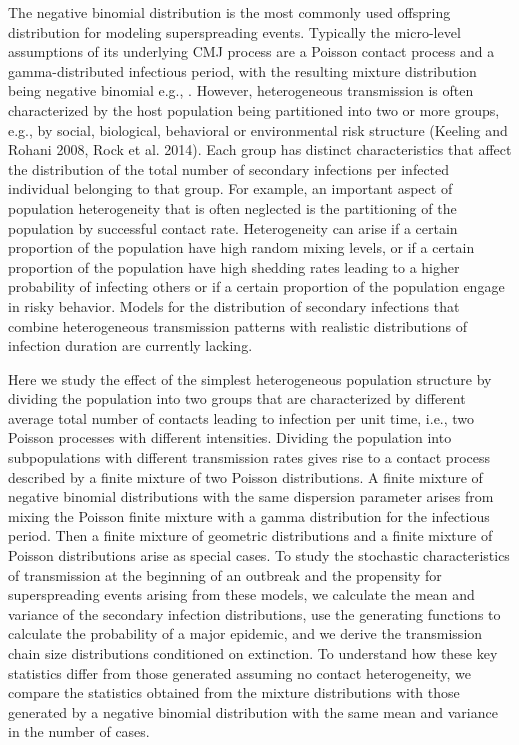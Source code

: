 \documentclass{imammb}
\numberwithin{equation}{section}
\begin{document}
The negative binomial distribution is the most commonly used offspring distribution for modeling superspreading events. Typically the micro-level assumptions of its underlying CMJ process are a Poisson contact process and a gamma-distributed infectious period, with the resulting mixture distribution being negative binomial e.g., \citep{Lloyd-Smith2005-ma}. However, heterogeneous transmission is often characterized by the host population being partitioned into two or more groups, e.g., by social, biological, behavioral or environmental risk structure (Keeling and Rohani 2008, Rock et al. 2014).   Each group has distinct characteristics that affect the distribution of the total number of secondary infections per infected individual belonging to that group. For example, an important aspect of population heterogeneity that is often neglected is the partitioning of the population by successful contact rate. Heterogeneity can arise if a certain proportion of the population have high random mixing levels, or if a certain proportion of the population have high shedding rates leading to a higher probability of infecting others or if a certain proportion of the population engage in risky behavior. Models for the distribution of secondary infections that combine heterogeneous transmission patterns with realistic distributions of infection duration are currently lacking.
 
Here we study the effect of the simplest heterogeneous population structure by dividing the population into two groups that are characterized by different average total number of contacts leading to infection per unit time, i.e., two Poisson processes with different intensities. Dividing the population into subpopulations with different transmission rates gives rise to a contact process described by a finite mixture of two Poisson distributions. A finite mixture of negative binomial distributions with the same dispersion parameter arises from mixing the Poisson finite mixture with a gamma distribution for the infectious period. Then a finite mixture of geometric distributions and a finite mixture of Poisson distributions arise as special cases.  To study the stochastic characteristics of transmission at the beginning of an outbreak and the propensity for superspreading events arising from these models, we calculate the mean and variance of the secondary infection distributions, use the generating functions to calculate the probability of a major epidemic, and we derive the transmission chain size distributions conditioned on extinction. To understand how these key statistics differ from those generated assuming no contact heterogeneity, we compare the statistics obtained from the mixture distributions with those generated by a negative binomial distribution with the same mean and variance in the number of cases.  %
 
\end{document}
